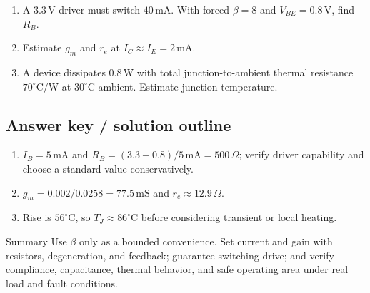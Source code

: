 \documentclass[10pt,letterpaper]{article}
\begin{document}
\begin{enumerate}
  \item A $3.3\,\mathrm{V}$ driver must switch $40\,\mathrm{mA}$. With forced $\beta=8$ and $V_{BE}=0.8\,\mathrm{V}$, find $R_B$.
  \item Estimate $g_m$ and $r_e$ at $I_C\approx I_E=2\,\mathrm{mA}$.
  \item A device dissipates $0.8\,\mathrm{W}$ with total junction-to-ambient thermal resistance $70^{\circ}\mathrm{C/W}$ at $30^{\circ}\mathrm{C}$ ambient. Estimate junction temperature.
\end{enumerate}\subsection{Answer key / solution outline}
\begin{enumerate}
  \item $I_B=5\,\mathrm{mA}$ and $R_B=(3.3-0.8)/5\,\mathrm{mA}=500\,\Omega$; verify driver capability and choose a standard value conservatively.
  \item $g_m=0.002/0.0258=77.5\,\mathrm{mS}$ and $r_e\approx12.9\,\Omega$.
  \item Rise is $56^{\circ}\mathrm{C}$, so $T_J\approx86^{\circ}\mathrm{C}$ before considering transient or local heating.
\end{enumerate}\begin{CornellSummaryBox}{Summary}
Use $\beta$ only as a bounded convenience. Set current and gain with resistors, degeneration, and feedback; guarantee switching drive; and verify compliance, capacitance, thermal behavior, and safe operating area under real load and fault conditions.
\end{CornellSummaryBox}
\end{document}
